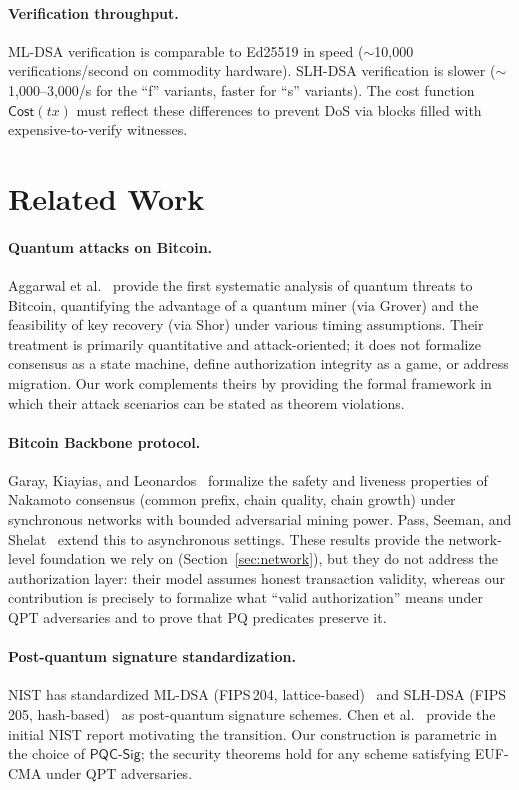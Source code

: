 \documentclass[11pt]{article}
\newcommand{\PQC}{\mathsf{PQC}}
\newcommand{\Cost}{\mathsf{Cost}}
\begin{document}
\paragraph{Verification throughput.}
ML-DSA verification is comparable to Ed25519 in speed ($\sim$10{,}000 verifications/second on commodity hardware).
SLH-DSA verification is slower ($\sim$1{,}000--3{,}000/s for the ``f'' variants, faster for ``s'' variants).
The cost function $\Cost(tx)$ must reflect these differences to prevent DoS via blocks filled with expensive-to-verify witnesses.

\section{Related Work}\label{sec:related}

\paragraph{Quantum attacks on Bitcoin.}
Aggarwal et al.~\cite{aggarwal2018quantum} provide the first systematic analysis of quantum threats to Bitcoin, quantifying the advantage of a quantum miner (via Grover) and the feasibility of key recovery (via Shor) under various timing assumptions.
Their treatment is primarily quantitative and attack-oriented; it does not formalize consensus as a state machine, define authorization integrity as a game, or address migration.
Our work complements theirs by providing the formal framework in which their attack scenarios can be stated as theorem violations.

\paragraph{Bitcoin Backbone protocol.}
Garay, Kiayias, and Leonardos~\cite{garay2015bitcoin} formalize the safety and liveness properties of Nakamoto consensus (common prefix, chain quality, chain growth) under synchronous networks with bounded adversarial mining power.
Pass, Seeman, and Shelat~\cite{pass2017analysis} extend this to asynchronous settings.
These results provide the network-level foundation we rely on (Section~\ref{sec:network}), but they do not address the authorization layer: their model assumes honest transaction validity, whereas our contribution is precisely to formalize what ``valid authorization'' means under QPT adversaries and to prove that PQ predicates preserve it.

\paragraph{Post-quantum signature standardization.}
NIST has standardized ML-DSA (FIPS\,204, lattice-based)~\cite{fips204} and SLH-DSA (FIPS\,205, hash-based)~\cite{fips205} as post-quantum signature schemes.
Chen et al.~\cite{chen2016report} provide the initial NIST report motivating the transition.
Our construction is parametric in the choice of $\PQC\textsf{-Sig}$; the security theorems hold for any scheme satisfying EUF-CMA under QPT adversaries.
\end{document}
